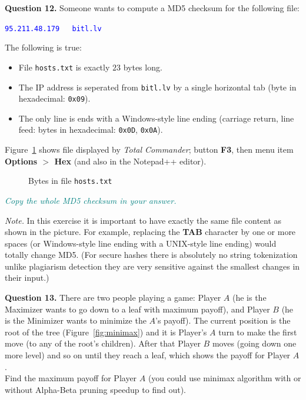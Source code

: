 \documentclass[jou]{apa6}
\begin{document}
\vspace{10pt}
{\bf Question 12.} Someone wants to compute a MD5 checksum for the following file: 

\textcolor{blue}{
{\tt 95.211.48.179~~~bitl.lv}
}

The following is true: 
\begin{itemize}
\item File {\tt hosts.txt} is exactly $23$ bytes long.
\item The IP address is seperated from {\tt bitl.lv} by 
a single horizontal tab (byte in hexadecimal: {\tt 0x09}). 
\item The only line is ends with a Windows-style line ending (carriage return, line feed: 
bytes in hexadecimal: {\tt 0x0D}, {\tt 0x0A}). 
\end{itemize}

Figure~\ref{fig:hosts-file} shows file displayed by {\em Total Commander}; 
button {\bf F3}, then menu item {\bf Options $>$ Hex} (and also in the Notepad++ editor).

\begin{figure}[!htb]
\caption{\label{fig:hosts-file} Bytes in file {\tt hosts.txt}}
\end{figure}

\textcolor{teal}{\em Copy the whole MD5 checksum in your answer.}

{\em Note.} In this exercise it is important to have exactly the
same file content as shown in the picture. 
For example, replacing the {\bf TAB} character
by one or more spaces (or Windows-style line ending with a UNIX-style
line ending) would totally change MD5. 
(For secure hashes there is absolutely no string tokenization \textendash{}
unlike plagiarism detection they are very sensitive against
the smallest changes in their input.)


\vspace{10pt}
{\bf Question 13.} There are two people playing a game: Player $A$ (he is the Maximizer \textendash{} wants
to go down to a leaf with maximum payoff), and Player $B$ (he is the Minimizer \textendash{} wants
to minimize the $A$'s payoff). The current position is the root of the tree (Figure~\ref{fig:minimax}) and it is Player's $A$
turn to make the first move (to any of the root's children). After that Player $B$ moves (going down one more level) and so on
\textendash{} until they reach a leaf, which shows the payoff for Player $A$.\\
Find the maximum payoff for Player $A$ (you could use minimax algorithm with or without Alpha-Beta pruning 
speedup to find out). 
\end{document}

